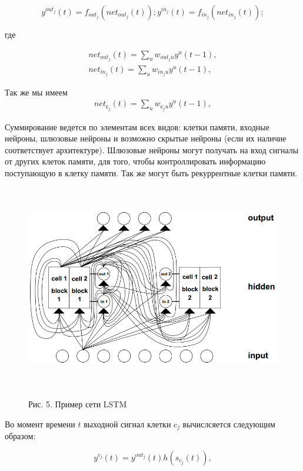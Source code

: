 \documentclass[14pt]{article}
\begin{document}
\begin{equation}
y^{out_j}(t) = f_{out_j}(net_{out_j}(t)); y^{in_j}(t) = f_{in_j}(net_{in_j}(t));
\end{equation}

где

\begin{eqnarray}
net_{out_j}(t) = \sum\limits_uw_{out_ju}y^u(t - 1),\nonumber\\
net_{in_j}(t) = \sum\limits_uw_{in_ju}y^u(t - 1),\nonumber
\end{eqnarray}


Так же мы имеем
\begin{eqnarray}
net_{с_j}(t) = \sum\limits_uw_{с_ju}y^u(t - 1),\nonumber
\end{eqnarray}

Суммирование ведется по элементам всех видов: клетки памяти, входные нейроны, шлюзовые нейроны и возможно скрытые нейроны (если их наличие соответствует архитектуре).  Шлюзовые нейроны могут получать на вход сигналы от других клеток памяти, для того, чтобы контроллировать информацию поступающую в клетку памяти. Так же могут быть рекуррентные клетки памяти.

\begin{figure}[!h]
    \centering
        \includegraphics[height=9cm]{Fig5.png}
    \parbox[t][1.2cm][c]{16cm}{
        \centering
        Рис. 5. Пример сети LSTM
    }
\end{figure}


Во момент времени $t$ выходной сигнал клетки $c_j$ вычислсяется следующим образом:

\begin{equation}
y^{c_j}(t) = y^{out_j}(t)h(s_{c_j}(t)),\nonumber
\end{equation}
\end{document}
